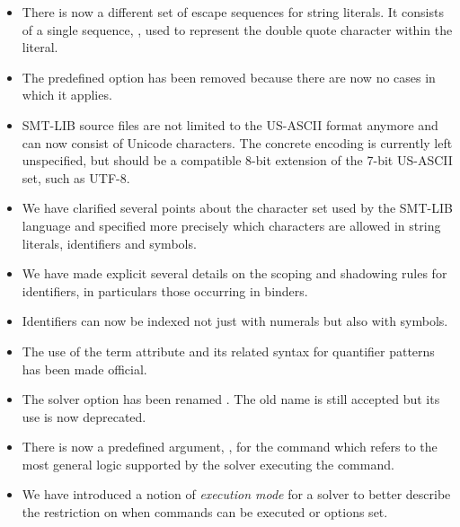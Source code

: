 \begin{itemize}
\item
There is now a different set of escape sequences for string literals.
It consists of a single sequence, , used to represent the double quote
character within the literal.

\item
The predefined option  has been removed
because there are now no cases in which it applies. 

\item
SMT-LIB source files are not limited to the US-ASCII format anymore
and can now consist of Unicode characters.  
The concrete encoding is currently left unspecified, but should be 
a compatible 8-bit extension of the 7-bit US-ASCII set, such as UTF-8.

\item
We have clarified several points about the character set used 
by the SMT-LIB language and specified more precisely which characters are allowed
in string literals, identifiers and symbols.

\item
We have made explicit several details on the scoping and shadowing rules
for identifiers, in particulars those occurring in binders.

\item
Identifiers can now be indexed not just with numerals but also with symbols.

\item
The use of the term attribute  and its related syntax 
for quantifier patterns has been made official.

 
\item
The solver option  has been renamed 
.
The old name is still accepted but its use is now deprecated.

\item
There is now a predefined argument, , for the  command
which refers to the most general logic supported by the solver executing the command.

\item
We have introduced a notion of \emph{execution mode} for a solver
to better describe the restriction on when commands can be executed 
or options set.


\end{itemize}
